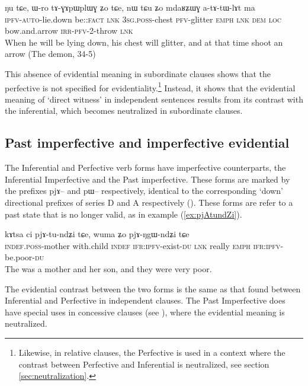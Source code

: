 \documentclass[oldfontcommands,oneside,a4paper,11pt]{article}
\newcommand{\ipa}[1]{{\phon \mbox{#1}}} %
\newcommand{\refb}[1]{(\ref{#1})}
\newcommand{\factual}[1]{\textsc{:fact}}
\begin{document}
\begin{exe}
\ex \label{ex:tAGApWplWG}
\gll \ipa{ku-nɯ-rŋgɯ} 	\ipa{ŋu} 	\ipa{tɕe,} 	\ipa{ɯ-ro} 	\ipa{tɤ-ɣɤpɯplɯɣ} 	\ipa{ʑo} 	\ipa{tɕe,} 	\ipa{nɯ} 	\ipa{tɕu} 	\ipa{ʑo} 	\ipa{mdaʁʑɯɣ} 	\ipa{a-tɤ-tɯ-lɤt} 	\ipa{ma}  \\
\textsc{ipfv-auto}-lie.down be:\factual{} \textsc{lnk} \textsc{3sg.poss}-chest \textsc{pfv}-glitter \textsc{emph} \textsc{lnk} \textsc{dem} \textsc{loc} bow.and.arrow \textsc{irr-pfv}-2-throw \textsc{lnk} \\
\glt When he will be lying down, his chest will glitter, and at that time shoot an arrow (The demon, 34-5)
\end{exe}


This absence of evidential meaning in subordinate clauses shows that the perfective is not specified for evidentiality.\footnote{Likewise, in relative clauses, the Perfective is used in a context where the contrast between Perfective and Inferential is neutralized, see section \ref{sec:neutralization}.} Instead, it shows that the evidential meaning of `direct witness' in independent sentences results from its contrast with the inferential, which becomes neutralized in subordinate clauses.


\subsection{Past imperfective and imperfective evidential}  \label{sec:pst:ipfv}
The Inferential and Perfective verb forms have imperfective counterparts, the Inferential Imperfective and the  Past imperfective. These forms are marked by the prefixes \ipa{pjɤ--} and \ipa{pɯ--} respectively, identical to the 
corresponding `down' directional prefixes of series D and A respectively (\citealt{lin11direction}). These forms are refer to a past state that is no longer valid, as in example \refb{ex:pjAtundZi}. 

\begin{exe}
\ex \label{ex:pjAtundZi}
\gll  \ipa{tɤ-mu} 	\ipa{kɤtsa} 	\ipa{ci} 	\ipa{pjɤ-tu-ndʑi} 	\ipa{tɕe,} 	\ipa{wuma} 	\ipa{ʑo} 	\ipa{pjɤ-ŋgɯ-ndʑi} 	\ipa{tɕe}  \\
\textsc{indef.poss}-mother with.child \textsc{indef} \textsc{ifr:ipfv}-exist-\textsc{du} \textsc{lnk} really \textsc{emph}  \textsc{ifr:ipfv}-be.poor-\textsc{du} \\
\glt The was a mother and her son, and they were very poor.
\end{exe}

The evidential contrast between the two forms is the same as that found between Inferential and Perfective in independent clauses. The Past Imperfective does have special uses in concessive clauses (see \citealt[298]{jacques14linking}), where the evidential meaning is neutralized.
\end{document}
